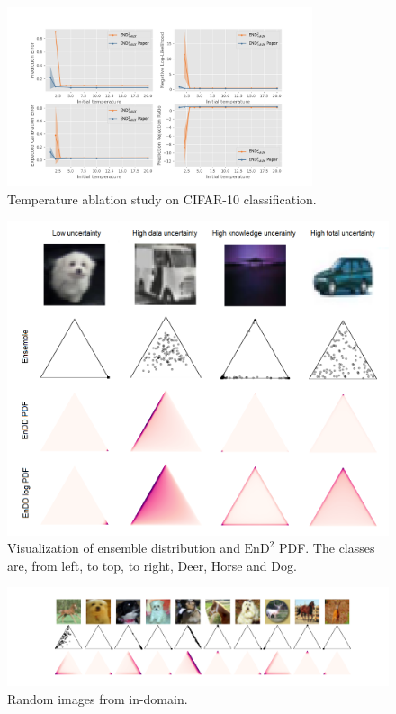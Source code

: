 \begin{figure}[h]
    \centering
    \includegraphics[trim = 55 19 55 50, clip, width = 0.8\textwidth]{../openreview/plots/Figure_11.png}
    \caption{Temperature ablation study on CIFAR-10 classification.}
    \label{fig:temp-ablation}
\end{figure}

\begin{figure}[H]
    \centering
    \includegraphics[width = 0.8\linewidth]{../openreview/plots/all_simplex.png}
    \caption{Visualization of ensemble distribution and $\text{EnD}^2$ PDF. The classes are, from left, to top, to right, Deer, Horse and Dog.}
    \label{fig:3simplex}
\end{figure}

\begin{figure}[H]
    \centering
    \includegraphics[trim = 0 0 0 20, clip, width = 1\linewidth]{../openreview/plots/simplex_in.png}
    \caption{Random images from in-domain.}
    \label{fig:simplex_in}
\end{figure}


